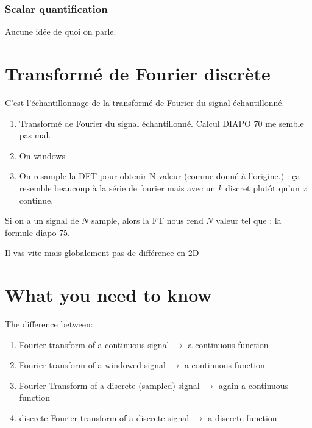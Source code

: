 \documentclass{article}
\theoremstyle{plain}%
\theoremstyle{definition}
\theoremstyle{remark}
\begin{document}
\subsubsection{Scalar quantification}
Aucune idée de quoi on parle.

\section{Transformé de Fourier discrète}
C'est l'échantillonnage de la transformé de Fourier du signal échantillonné.  \begin{enumerate}
    \item Transformé de Fourier du signal échantillonné. Calcul DIAPO 70 me semble pas mal.
    \item On windows
    \item On resample la DFT pour obtenir N valeur (comme donné à l'origine.) : ça resemble beaucoup à la série de fourier mais avec un $ k $ discret plutôt qu'un $ x $ continue. 
\end{enumerate}
Si on a un signal de $ N $ sample, alors la FT nous rend $ N $ valeur tel que : la formule diapo 75. 

Il vas vite mais globalement pas de différence en 2D 

\section{What you need to know}
The difference between:
\begin{enumerate}
    \item Fourier transform of a continuous signal $\rightarrow$ a continuous function
    \item Fourier transform of a windowed signal $\rightarrow$ a continuous function
    \item Fourier Transform of a discrete (sampled) signal $\rightarrow$ again a continuous function
    \item discrete Fourier transform of a discrete signal $\rightarrow$ a discrete function
\end{enumerate}
\end{document}
